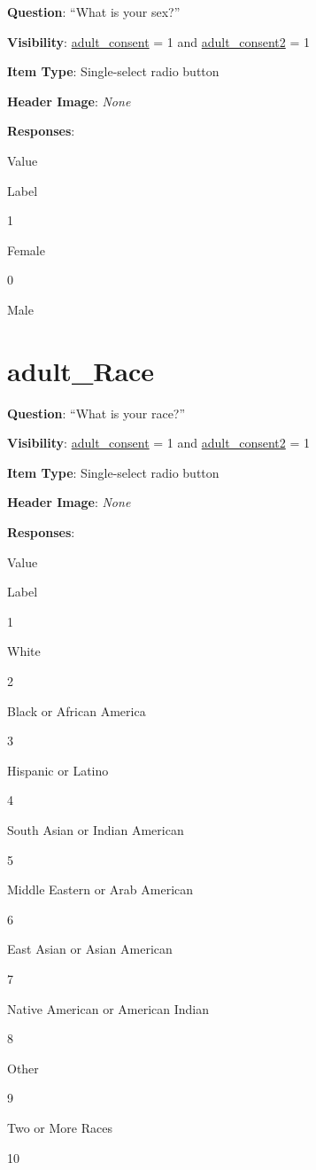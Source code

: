 \documentclass[]{book}
\begin{document}
\textbf{Question}: ``What is your sex?''

\textbf{Visibility}: \protect\hyperlink{adult_consent}{adult\_consent} = 1 and \protect\hyperlink{adult_consent2}{adult\_consent2} = 1

\textbf{Item Type}: Single-select radio button

\textbf{Header Image}: \emph{None}

\textbf{Responses}:

Value

Label

1

Female

0

Male

\hypertarget{adult_race}{%
\section{adult\_Race}\label{adult_race}}

\textbf{Question}: ``What is your race?''

\textbf{Visibility}: \protect\hyperlink{adult_consent}{adult\_consent} = 1 and \protect\hyperlink{adult_consent2}{adult\_consent2} = 1

\textbf{Item Type}: Single-select radio button

\textbf{Header Image}: \emph{None}

\textbf{Responses}:

Value

Label

1

White

2

Black or African America

3

Hispanic or Latino

4

South Asian or Indian American

5

Middle Eastern or Arab American

6

East Asian or Asian American

7

Native American or American Indian

8

Other

9

Two or More Races

10
\end{document}
